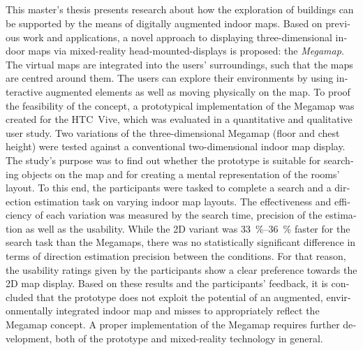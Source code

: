 \begin{otherlanguage}{british}
\chapter*{\abstractname}
\thispagestyle{empty}

This master's thesis presents research about how the exploration of buildings can be supported by the means of digitally augmented indoor maps.
Based on previous work and applications, a novel approach to displaying three-dimensional indoor maps via mixed-reality head-mounted-displays is proposed: the \emph{Megamap}.
The virtual maps are integrated into the users' surroundings, such that the maps are centred around them.
The users can explore their environments by using interactive augmented elements as well as moving physically on the map.
To proof the feasibility of the concept, a prototypical implementation of the Megamap was created for the HTC~Vive, which was evaluated in a quantitative and qualitative user study.
Two variations of the three-dimensional Megamap (floor and chest height) were tested against a conventional two-dimensional indoor map display.
The study's purpose was to find out whether the prototype is suitable for searching objects on the map and for creating a mental representation of the rooms' layout.
To this end, the participants were tasked to complete a search and a direction estimation task on varying indoor map layouts.
The effectiveness and efficiency of each variation was measured by the search time, precision of the estimation as well as the usability.
While the 2D variant was \SIrange{33}{36}{\percent} faster for the search task than the Megamaps, there was no statistically significant difference in terms of direction estimation precision between the conditions.
For that reason, the usability ratings given by the participants show a clear preference towards the 2D map display.
Based on these results and the participants' feedback, it is concluded that the prototype does not exploit the potential of an augmented, environmentally integrated indoor map and misses to appropriately reflect the Megamap concept.
A proper implementation of the Megamap requires further development, both of the prototype and mixed-reality technology in general.

\end{otherlanguage}
\cleardoublepage
